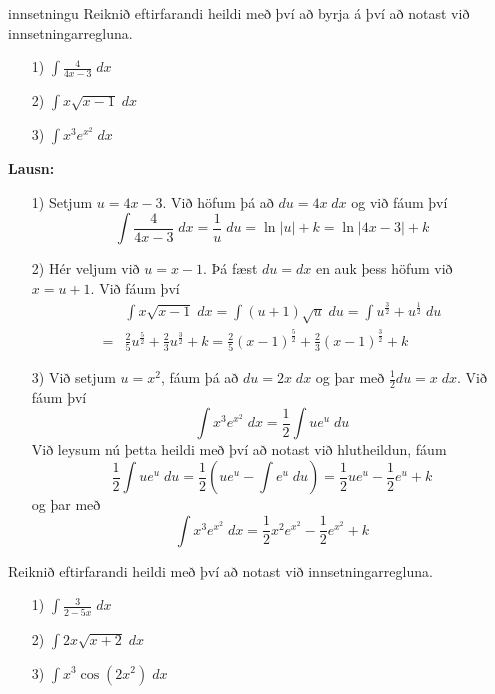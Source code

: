 \begin{syn}{innsetningu}
Reiknið eftirfarandi heildi með því að byrja á því að notast við innsetningarregluna.
\begin{itemize}
\item[1)] $\displaystyle \int \frac{4}{4x-3}\; dx$

\item[2)] $\displaystyle \int x\sqrt{x-1} \; dx$

\item[3)] $\displaystyle \int x^{3}e^{x^{2}} \; dx$
\end{itemize}

\vspace{2mm}

{\bf Lausn:}
\begin{itemize}
\item[1)] Setjum $u = 4x - 3$. Við höfum þá að $du = 4x\;dx$ og við fáum því
$$
\int \frac{4}{4x-3} \; dx = \frac{1}{u} \; du = \ln|u| + k = \ln|4x-3|+k
$$

\item[2)] Hér veljum við $u = x - 1$. Þá fæst $du = dx$ en auk þess höfum við $x = u + 1$. Við fáum því
\setlength{\jot}{4mm}
\begin{align*}
&\int x\sqrt{x-1} \; dx = \int (u+1)\sqrt{u} \; du = \int u^{\tfrac{3}{2}} + u^{\tfrac{1}{2}} \; du\\ = &\frac{2}{5}u^{\tfrac{5}{2}}+\frac{2}{3}u^{\tfrac{3}{2}} + k = \frac{2}{5}\left(x-1\right)^{\tfrac{5}{2}}+\frac{2}{3}\left(x-1\right)^{\tfrac{3}{2}} + k
\end{align*}

\item[3)] Við setjum $u = x^{2}$, fáum þá að $du = 2x \; dx$ og þar með $\frac{1}{2}du = x\; dx$. Við fáum því
$$
\int x^{3}e^{x^{2}} \; dx = \frac{1}{2}\int u e^{u} \; du 
$$
Við leysum nú þetta heildi með því að notast við hlutheildun, fáum
$$
\frac{1}{2}\int u e^{u} \; du =  \frac{1}{2}\left(ue^{u} - \int e^{u} \; du\right) = \frac{1}{2}ue^{u}-\frac{1}{2}e^{u} + k
$$
og þar með
$$
\int x^{3}e^{x^{2}} \; dx = \frac{1}{2}x^{2}e^{x^{2}}-\frac{1}{2}e^{x^{2}} + k
$$
\end{itemize}

\end{syn}

\begin{æd}
Reiknið eftirfarandi heildi með því að notast við innsetningarregluna.
\begin{itemize}
\item[1)] $\displaystyle \int \frac{3}{2-5x} \; dx$

\item[2)] $\displaystyle \int 2x\sqrt{x+2}\; dx$

\item[3)] $\displaystyle \int x^{3}\cos\left(2x^{2}\right)\; dx$
\end{itemize}

\end{æd}


